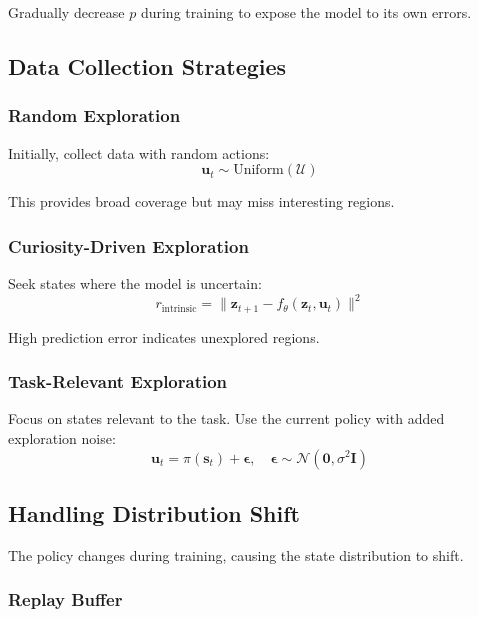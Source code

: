Gradually decrease $p$ during training to expose the model to its own errors.

\subsection{Data Collection Strategies}

\subsubsection{Random Exploration}

Initially, collect data with random actions:
\begin{equation}
\mathbf{u}_t \sim \text{Uniform}(\mathcal{U})
\end{equation}

This provides broad coverage but may miss interesting regions.

\subsubsection{Curiosity-Driven Exploration}

Seek states where the model is uncertain:
\begin{equation}
r_{\text{intrinsic}} = \| \mathbf{z}_{t+1} - f_\theta(\mathbf{z}_t, \mathbf{u}_t) \|^2
\end{equation}

High prediction error indicates unexplored regions.

\subsubsection{Task-Relevant Exploration}

Focus on states relevant to the task. Use the current policy with added exploration noise:
\begin{equation}
\mathbf{u}_t = \pi(\mathbf{s}_t) + \boldsymbol{\epsilon}, \quad \boldsymbol{\epsilon} \sim \mathcal{N}(\mathbf{0}, \sigma^2 \mathbf{I})
\end{equation}

\subsection{Handling Distribution Shift}

The policy changes during training, causing the state distribution to shift.

\subsubsection{Replay Buffer}

